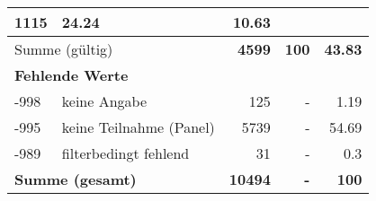 \begin{longtable}{lXrrr}
       \num{1115} &
       \num[round-mode=places,round-precision=2]{24.24} &
         \num[round-mode=places,round-precision=2]{10.63} \\
     \midrule
     \multicolumn{2}{l}{Summe (gültig)} &
       \textbf{\num{4599}} &
     \textbf{\num{100}} &
       \textbf{\num[round-mode=places,round-precision=2]{43.83}} \\
     \multicolumn{5}{l}{\textbf{Fehlende Werte}}\\
       -998 &
       keine Angabe &
         \num{125} &
        - &
         \num[round-mode=places,round-precision=2]{1.19} \\
       -995 &
       keine Teilnahme (Panel) &
         \num{5739} &
        - &
         \num[round-mode=places,round-precision=2]{54.69} \\
       -989 &
       filterbedingt fehlend &
         \num{31} &
        - &
         \num[round-mode=places,round-precision=2]{0.3} \\
     \midrule
     \multicolumn{2}{l}{\textbf{Summe (gesamt)}} &
          \textbf{\num{10494}} &
        \textbf{-} &
        \textbf{\num{100}} \\
     \bottomrule
     \end{longtable}
     
